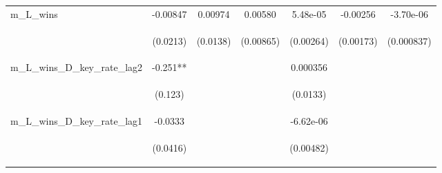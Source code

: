 \documentclass[]{article}
\begin{document}
\begin{center}
\begin{tabular}{lcccccc}
m\_L\_wins & -0.00847 & 0.00974 & 0.00580 & 5.48e-05 & -0.00256 & -3.70e-06 \\
\vspace{4pt} & \begin{footnotesize}(0.0213)\end{footnotesize} & \begin{footnotesize}(0.0138)\end{footnotesize} & \begin{footnotesize}(0.00865)\end{footnotesize} & \begin{footnotesize}(0.00264)\end{footnotesize} & \begin{footnotesize}(0.00173)\end{footnotesize} & \begin{footnotesize}(0.000837)\end{footnotesize} \\
m\_L\_wins\_D\_key\_rate\_lag2 & -0.251** &  &  & 0.000356 &  &  \\
\vspace{4pt} & \begin{footnotesize}(0.123)\end{footnotesize} & \begin{footnotesize}\end{footnotesize} & \begin{footnotesize}\end{footnotesize} & \begin{footnotesize}(0.0133)\end{footnotesize} & \begin{footnotesize}\end{footnotesize} & \begin{footnotesize}\end{footnotesize} \\
m\_L\_wins\_D\_key\_rate\_lag1 & -0.0333 &  &  & -6.62e-06 &  &  \\
\vspace{4pt} & \begin{footnotesize}(0.0416)\end{footnotesize} & \begin{footnotesize}\end{footnotesize} & \begin{footnotesize}\end{footnotesize} & \begin{footnotesize}(0.00482)\end{footnotesize} & \begin{footnotesize}\end{footnotesize} & \begin{footnotesize}\end{footnotesize} \\

\end{tabular}
\end{center}
\end{document}
